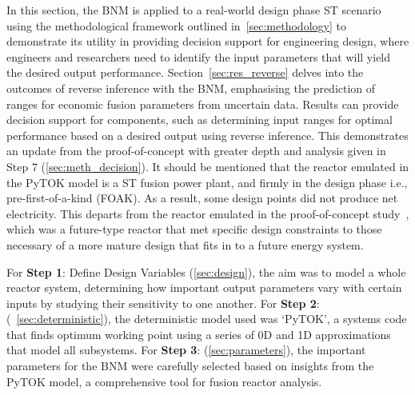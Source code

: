 \documentclass[journal]{IEEEtran}
\begin{document}
In this section, the BNM is applied to a real-world design phase ST scenario using the methodological framework outlined in~\ref{sec:methodology} to demonstrate its utility in providing decision support for engineering design, where engineers and researchers need to identify the input parameters that will yield the desired output performance. Section~\ref{sec:res_reverse} delves into the outcomes of reverse inference with the BNM, emphasising the prediction of ranges for economic fusion parameters from uncertain data. Results can provide decision support for components, such as determining input ranges for optimal performance based on a desired output using reverse inference. This demonstrates an update from the proof-of-concept with greater depth and analysis given in Step 7 (\ref{sec:meth_decision}). It should be mentioned that the reactor emulated in the PyTOK model is a ST fusion power plant, and firmly in the design phase i.e., pre-first-of-a-kind (FOAK). As a result, some design points did not produce net electricity. This departs from the reactor emulated in the proof-of-concept study~\cite{Griffiths2024}, which was a future-type reactor that met specific design constraints to those necessary of a more mature design that fits in to a future energy system.

For \textbf{Step 1}: Define Design Variables (\ref{sec:design}), the aim was to model a whole reactor system, determining how important output parameters vary with certain inputs by studying their sensitivity to one another. For \textbf{Step 2}: (~\ref{sec:deterministic}), the deterministic  model used was `PyTOK', a systems code that finds optimum working point using a series of 0D and 1D approximations that model all subsystems. For \textbf{Step 3}: (\ref{sec:parameters}), the important parameters for the BNM were carefully selected based on insights from the PyTOK model, a comprehensive tool for fusion reactor analysis.
\end{document}
